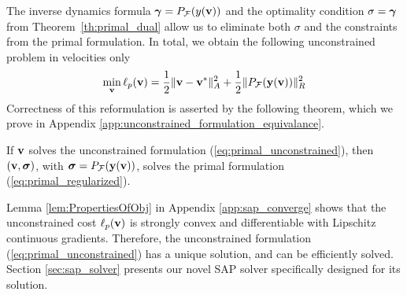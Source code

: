 The inverse dynamics formula ${\bm\gamma} = P_{\mathcal{F}}(y({\mathbf{v}}))$  and the optimality
condition $\sigma = {\bm\gamma}$ from Theorem~\ref{th:primal_dual}
allow us to eliminate both $\sigma$ and the constraints from the primal
formulation. In total, we obtain the following unconstrained problem
in velocities only
\begin{eqnarray}
	\min_{\mf{v}} \ell_p(\mf{v}) = \frac{1}{2}\Vert\mf{v}-\mf{v}^*\Vert_{A}^2 +
	\frac{1}{2}\Vert P_\mathcal{F}(\mf{y}(\mf{v}))\Vert_R^2
	\label{eq:primal_unconstrained}
\end{eqnarray}
Correctness of this reformulation is asserted by the following theorem, 
which we prove in Appendix \ref{app:unconstrained_formulation_equivalance}.
\begin{theorem}
  If  ${\mathbf{v}}$ solves the unconstrained formulation (\ref{eq:primal_unconstrained}),
    then $({\mathbf{v}}, {\bm\sigma})$,
    with ${\bm\sigma} =P_\mathcal{F}({\mathbf{y}}({\mathbf{v}}))$,
    solves the primal
    formulation (\ref{eq:primal_regularized}).
    \label{th:unconstrained_formulation_equivalance}
\end{theorem}
Lemma \ref{lem:PropertiesOfObj} in Appendix \ref{app:sap_converge}
shows that the unconstrained cost $\ell_p({\mathbf{v}})$ is strongly convex and
differentiable with Lipschitz continuous gradients. Therefore, the unconstrained
formulation (\ref{eq:primal_unconstrained}) has a unique solution, and can be
efficiently solved.  
Section \ref{sec:sap_solver} presents our novel SAP solver specifically designed
for its solution.

